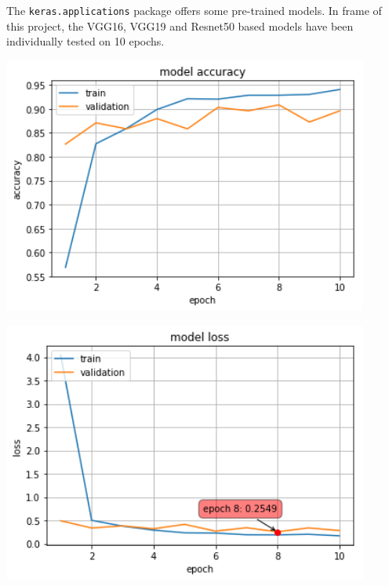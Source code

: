 The \texttt{keras.applications} package offers some pre-trained models. In frame of this project, the VGG16, VGG19 and Resnet50 based models have been individually tested on 10 epochs. 

\begin{center}
	\centering
	\begin{minipage}{0.5\textwidth}
		\centering
		\includegraphics[width=0.9\textwidth]{./sections/03_methodology/VGG16_10epochs_acc.png}
		\label{VGG16_10e_Acc}
	\end{minipage}\hfill
	\begin{minipage}{0.5\textwidth}
		\centering
		\includegraphics[width=0.9\textwidth]{./sections/03_methodology/VGG16_10epochs_loss.png} 
		\label{VGG16_10e_Loss}
	\end{minipage}
\end{center}


